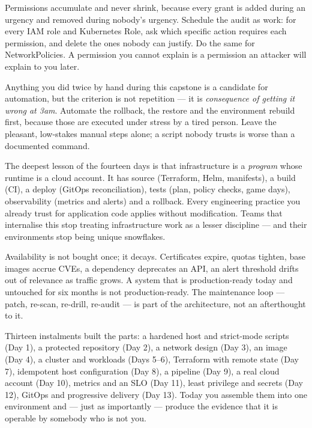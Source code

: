 \begin{secwarn}
Permissions accumulate and never shrink, because every grant is added during an urgency and removed during nobody's urgency. Schedule the audit as work: for every IAM role and Kubernetes Role, ask which specific action requires each permission, and delete the ones nobody can justify. Do the same for NetworkPolicies. A permission you cannot explain is a permission an attacker will explain to you later.
\end{secwarn}

\begin{autotip}
Anything you did twice by hand during this capstone is a candidate for automation, but the criterion is not repetition --- it is \emph{consequence of getting it wrong at 3am}. Automate the rollback, the restore and the environment rebuild first, because those are executed under stress by a tired person. Leave the pleasant, low-stakes manual steps alone; a script nobody trusts is worse than a documented command.
\end{autotip}

\begin{infranote}
The deepest lesson of the fourteen days is that infrastructure is a \emph{program} whose runtime is a cloud account. It has source (Terraform, Helm, manifests), a build (CI), a deploy (GitOps reconciliation), tests (plan, policy checks, game days), observability (metrics and alerts) and a rollback. Every engineering practice you already trust for application code applies without modification. Teams that internalise this stop treating infrastructure work as a lesser discipline --- and their environments stop being unique snowflakes.
\end{infranote}

\begin{reliability}
Availability is not bought once; it decays. Certificates expire, quotas tighten, base images accrue CVEs, a dependency deprecates an API, an alert threshold drifts out of relevance as traffic grows. A system that is production-ready today and untouched for six months is not production-ready. The maintenance loop --- patch, re-scan, re-drill, re-audit --- is part of the architecture, not an afterthought to it.
\end{reliability}


Thirteen instalments built the parts: a hardened host and strict-mode scripts (Day 1), a protected repository (Day 2), a network design (Day 3), an image (Day 4), a cluster and workloads (Days 5--6), Terraform with remote state (Day 7), idempotent host configuration (Day 8), a pipeline (Day 9), a real cloud account (Day 10), metrics and an SLO (Day 11), least privilege and secrets (Day 12), GitOps and progressive delivery (Day 13). Today you assemble them into one environment and --- just as importantly --- produce the evidence that it is operable by somebody who is not you.

